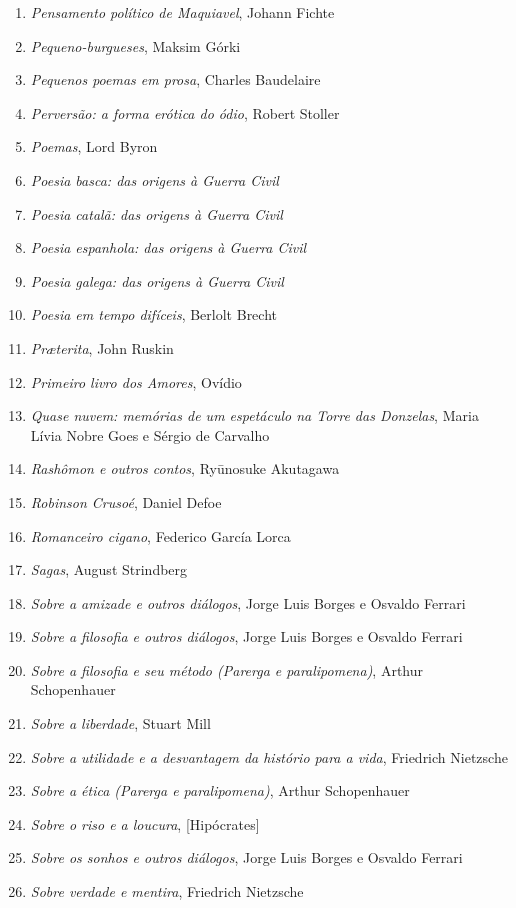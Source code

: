 \begin{enumerate}
\item \textit{Pensamento político de Maquiavel}, Johann Fichte
\item \textit{Pequeno-burgueses}, Maksim Górki
\item \textit{Pequenos poemas em prosa}, Charles Baudelaire
\item \textit{Perversão: a forma erótica do ódio}, Robert Stoller
\item \textit{Poemas}, Lord Byron
\item \textit{Poesia basca: das origens à Guerra Civil} 
\item \textit{Poesia catalã: das origens à Guerra Civil} 
\item \textit{Poesia espanhola: das origens à Guerra Civil} 
\item \textit{Poesia galega: das origens à Guerra Civil} 
\item \textit{Poesia em tempo difíceis}, Berlolt Brecht 
\item \textit{Pr\ae terita}, John Ruskin
\item \textit{Primeiro livro dos Amores}, Ovídio
\item \textit{Quase nuvem: memórias de um espetáculo na Torre das Donzelas}, Maria Lívia Nobre Goes e Sérgio de Carvalho
\item \textit{Rashômon e outros contos}, Ryūnosuke Akutagawa
\item \textit{Robinson Crusoé}, Daniel Defoe
\item \textit{Romanceiro cigano}, Federico García Lorca
\item \textit{Sagas}, August Strindberg
\item \textit{Sobre a amizade e outros diálogos}, Jorge Luis Borges e Osvaldo Ferrari
\item \textit{Sobre a filosofia e outros diálogos}, Jorge Luis Borges e Osvaldo Ferrari
\item \textit{Sobre a filosofia e seu método (Parerga e paralipomena)}, Arthur Schopenhauer 
\item \textit{Sobre a liberdade}, Stuart Mill
\item \textit{Sobre a utilidade e a desvantagem da histório para a vida}, Friedrich Nietzsche
\item \textit{Sobre a ética (Parerga e paralipomena)}, Arthur Schopenhauer 
\item \textit{Sobre o riso e a loucura}, [Hipócrates]
\item \textit{Sobre os sonhos e outros diálogos}, Jorge Luis Borges e Osvaldo Ferrari
\item \textit{Sobre verdade e mentira}, Friedrich Nietzsche

\end{enumerate}
